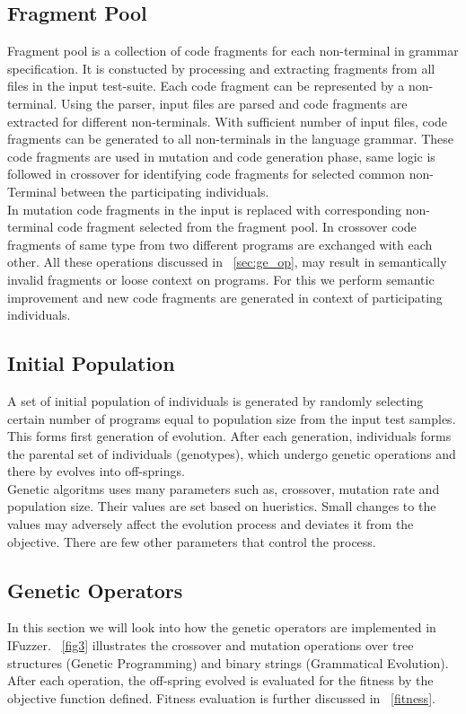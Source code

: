 \documentclass{acm_proc_article-sp}
\begin{document}
\subsection{Fragment Pool}
Fragment pool is a collection of code fragments for each non-terminal in grammar specification. It is constucted by processing and extracting fragments from all files in the input test-suite. Each code fragment can be represented by a non-terminal. Using the parser, input files are parsed and code fragments are extracted for different non-terminals. With sufficient number of input files, code fragments can be generated to all non-terminals in the language grammar. These code fragments are used in mutation and code generation phase, same logic is followed in crossover for identifying code fragments for selected common non-Terminal between the participating individuals. \\
\indent In mutation code fragments in the input is replaced with corresponding non-terminal code fragment selected from the fragment pool. In crossover code fragments of same type from two different programs are exchanged with each other. All these operations discussed in ~\autoref{sec:ge_op}, may result in  semantically invalid fragments or loose context on programs. For this we perform semantic improvement and new code fragments are generated in context of participating individuals.

\subsection{Initial Population}
A set of initial population of individuals is generated by randomly selecting certain number of programs equal to population size from the input test samples. This forms first generation of evolution. After each generation, individuals forms the parental set of individuals (genotypes), which undergo genetic operations and there by evolves into off-springs.\\
\indent Genetic algoritms uses many parameters such as, crossover, mutation rate and population size. Their values are set based on hueristics. Small changes to the values may adversely affect the evolution process and deviates it from the objective. There are few other parameters that control the process. 

\subsection{Genetic Operators} \label{sec:ge_op}
In this section we will look into how the genetic operators are implemented in IFuzzer. ~\autoref{fig3} illustrates the crossover and mutation operations over tree structures (Genetic Programming) and binary strings (Grammatical Evolution). After each operation, the off-spring evolved is evaluated for the fitness by the objective function defined. Fitness evaluation is further discussed in ~\autoref{fitness}.
\end{document}
